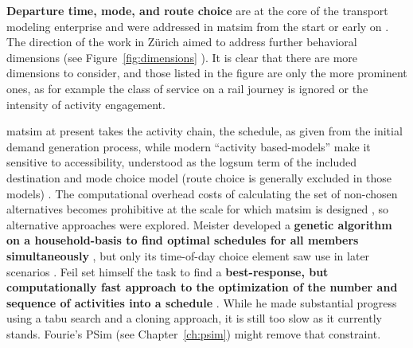 \textbf{Departure time, mode, and route choice} are at the core of the transport modeling enterprise and were addressed in \gls{matsim} from the start \citep{RaneyNagel2004agdb} or early on \citep{BalmerRaneyEtAl2005act-times,RieserGretherNagel2008modeChoiceCalculations}.
%
The direction of the work in Zürich aimed to address further behavioral dimensions 
(see Figure~\ref{fig:dimensions} ). 
It is clear
that there are more dimensions to consider, and those listed in the figure are only the more prominent ones, as for example the class of service on a rail journey is ignored or the intensity of activity engagement. 

\gls{matsim} at present takes the activity chain, the schedule, as given from the initial demand generation process, while modern ``activity based-models'' make it sensitive to accessibility, understood as the logsum term of the included destination and mode choice model (route choice is generally excluded in those models) \citep[see][for an early example]{BenAkivaEtAl_Transportation_1996}.
The computational overhead costs of calculating the set of non-chosen alternatives becomes prohibitive at the scale for which \gls{matsim} is designed , so alternative approaches were explored. 
%
Meister developed a \textbf{genetic algorithm on a household-basis to find optimal schedules for all members simultaneously} \citep[reported in][]{MeisterEtAl_Transportation_2005},
but only its time-of-day choice element saw use in later scenarios \citep{MeisterEtAl_IATBR_2006}.
%
Feil set himself the task to find a \textbf{best-response, but computationally fast approach to the optimization of the number and sequence of activities into a schedule} \citep[][]{Feil_PhDThesis_2010}. While he made substantial progress using a tabu search and a cloning approach, it is still too slow as it currently stands. Fourie's PSim (see Chapter~\ref{ch:psim}) might remove that constraint.


